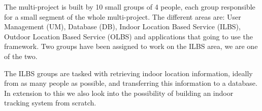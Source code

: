 The multi-project is built by 10 small groups of 4 people, each group responsible for a small segment of the whole multi-project. The different areas are: User Management (UM), Database (DB), Indoor Location Based Service (ILBS), Outdoor Location Based Service (OLBS) and applications that going to use the framework. Two groups have been assigned to work on the ILBS area, we are one of the two.

The ILBS groups are tasked with retrieving indoor location information, ideally from as many people as possible, and transferring this information to a database. In extension to this we also look into the possibility of building an indoor tracking system from scratch.